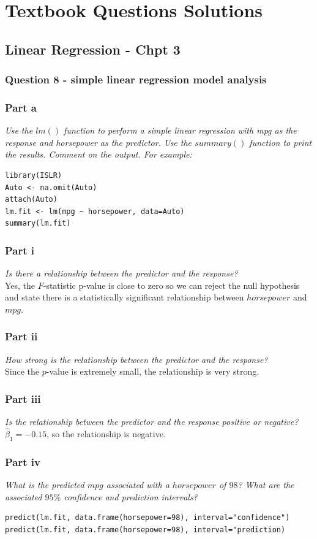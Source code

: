 \documentclass[11pt]{article}
\begin{document}
\newpage
\section{Textbook Questions Solutions}
\subsection{Linear Regression - Chpt 3}
\subsubsection{Question 8 - simple linear regression model analysis}
\subsubsection*{Part a}
\textit{Use the $lm()$ function to perform a simple linear regression with
mpg as the response and horsepower as the predictor. Use the
$summary()$ function to print the results. Comment on the output.
For example:}
\begin{lstlisting}
library(ISLR)
Auto <- na.omit(Auto)
attach(Auto)
lm.fit <- lm(mpg ~ horsepower, data=Auto)
summary(lm.fit)
\end{lstlisting}
\subsubsection*{Part i}
\textit{Is there a relationship between the predictor and the response?} \\
\noindent Yes, the $F$-statistic p-value is close to zero so we can reject the null hypothesis and state there is a statistically significant relationship between $horsepower$ and $mpg$.
\subsubsection*{Part ii}
\textit{How strong is the relationship between the predictor and the response?} \\
\noindent Since the $p$-value is extremely small, the relationship is very strong.
\subsubsection*{Part iii}
\textit{Is the relationship between the predictor and the response positive or negative?} \\
\noindent $\hat\beta_1=-0.15$, so the relationship is negative.
\subsubsection*{Part iv}
\textit{What is the predicted $mpg$ associated with a $horsepower$ of
$98$? What are the associated $95\%$ confidence and prediction
intervals?}
\begin{lstlisting}
predict(lm.fit, data.frame(horsepower=98), interval="confidence")
predict(lm.fit, data.frame(horsepower=98), interval="prediction)
\end{lstlisting}
\end{document}
